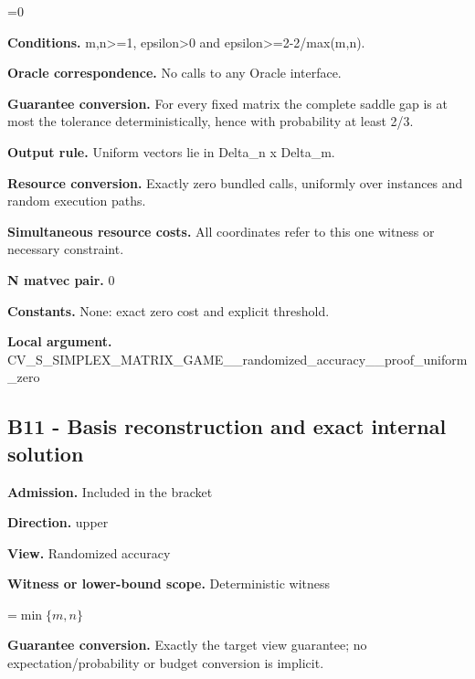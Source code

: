 \documentclass[10pt,a4paper]{article}
\newcommand{\AtlasMath}[1]{\par\begingroup\centering\setbox0=\hbox{$\displaystyle #1$}\ifdim\wd0>1.4\linewidth\typeout{ATLAS WIDE FORMULA: \the\wd0}\fi\ifdim\wd0>\linewidth\resizebox{\linewidth}{!}{\box0}\else\box0\fi\par\endgroup}
\begin{document}
\AtlasMath{0}


\textbf{Conditions.} m,n>=1, epsilon>0 and epsilon>=2-2/max(m,n).



\textbf{Oracle correspondence.} No calls to any Oracle interface.



\textbf{Guarantee conversion.} For every fixed matrix the complete saddle gap is at most the tolerance deterministically, hence with probability at least 2/3.



\textbf{Output rule.} Uniform vectors lie in Delta\_n x Delta\_m.



\textbf{Resource conversion.} Exactly zero bundled calls, uniformly over instances and random execution paths.



\textbf{Simultaneous resource costs.} All coordinates refer to this one witness or necessary constraint.



\textbf{N matvec pair.} 0



\textbf{Constants.} None: exact zero cost and explicit threshold.



\textbf{Local argument.} CV\_S\_SIMPLEX\_MATRIX\_GAME\allowbreak{}\_\_randomized\_accuracy\_\_p\allowbreak{}roof\_uniform\_zero



\subsection{B11 - Basis reconstruction and exact internal solution}


\textbf{Admission.} Included in the bracket



\textbf{Direction.} upper



\textbf{View.} Randomized accuracy



\textbf{Witness or lower-bound scope.} Deterministic witness



\AtlasMath{\min\{m,n\}}


\textbf{Guarantee conversion.} Exactly the target view guarantee; no expectation/probability or budget conversion is implicit.
\end{document}
